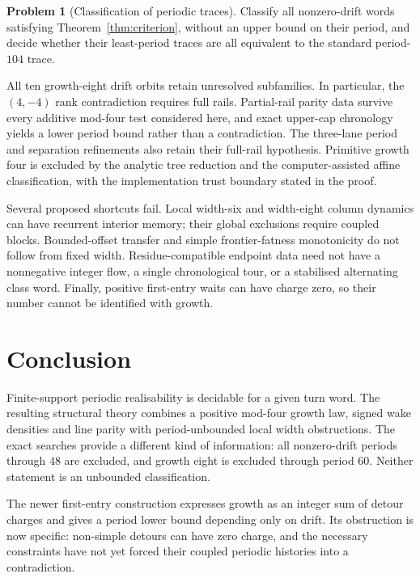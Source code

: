 \documentclass[11pt,letterpaper]{article}
\theoremstyle{plain}
\theoremstyle{definition}
\newtheorem{problem}[theorem]{Problem}
\begin{document}
\begin{NoHyper}
\begin{problem}[Classification of periodic traces]\label{prob:periodic}
Classify all nonzero-drift words satisfying Theorem~\ref{thm:criterion}, without
an upper bound on their period, and decide whether their least-period traces
are all equivalent to the standard period-$104$ trace.
\end{problem}
All ten growth-eight drift orbits retain unresolved subfamilies. In particular,
the $(4,-4)$ rank contradiction requires full rails. Partial-rail parity
data survive every additive mod-four test considered here, and exact
upper-cap chronology yields a lower period bound rather than a contradiction.
The three-lane period and separation refinements also retain their full-rail
hypothesis. Primitive growth four is excluded by the analytic tree reduction and the
computer-assisted affine classification, with the implementation trust
boundary stated in the proof.

Several proposed shortcuts fail. Local width-six and width-eight column
dynamics can have recurrent interior memory; their global exclusions require
coupled blocks. Bounded-offset transfer and simple frontier-fatness
monotonicity do not follow from fixed width. Residue-compatible endpoint
data need not have a nonnegative integer flow, a single chronological tour,
or a stabilised alternating class word. Finally, positive first-entry waits
can have charge zero, so their number cannot be identified with growth.

\section{Conclusion}\label{sec:conclusion}
Finite-support periodic realisability is decidable for a given turn word.
The resulting structural theory combines a positive mod-four growth law,
signed wake densities and line parity with period-unbounded local width
obstructions. The exact searches provide a different kind of information:
all nonzero-drift periods through $48$ are excluded, and growth eight is
excluded through period $60$. Neither statement is an unbounded
classification.

The newer first-entry construction expresses growth as an integer sum of
detour charges and gives a period lower bound depending only on drift.
Its obstruction is now specific: non-simple detours can have zero charge,
and the necessary constraints have not yet forced their coupled periodic
histories into a contradiction.




\end{NoHyper}
\end{document}
